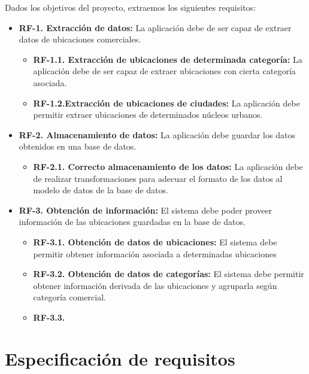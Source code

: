 Dados los objetivos del proyecto, extraemos los siguientes requisitos:

\begin{itemize}
	\item \textbf{RF-1. Extracción de datos:} La aplicación debe de ser capaz de extraer datos de ubicaciones comerciales.
		\begin{itemize}
			\item \textbf{RF-1.1. Extracción de ubicaciones de determinada categoría:} La aplicación debe de ser capaz de extraer ubicaciones con cierta categoría asociada.
			\item \textbf{RF-1.2.Extracción de ubicaciones de ciudades:} La aplicación debe permitir extraer ubicaciones de determinados núcleos urbanos.
		\end{itemize}
	\item \textbf{RF-2. Almacenamiento de datos:} La aplicación debe guardar los datos obtenidos en una base de datos.
		\begin{itemize}
			\item \textbf{RF-2.1. Correcto almacenamiento de los datos:} La aplicación debe de realizar transformaciones para adecuar el formato de los datos al modelo de datos de la base de datos.
		\end{itemize}
	\item \textbf{RF-3. Obtención de información:} El sistema debe poder proveer información de las ubicaciones guardadas en la base de datos.
		\begin{itemize}
			\item \textbf{RF-3.1. Obtención de datos de ubicaciones:} El sistema debe permitir obtener información asociada a determinadas ubicaciones
			\item \textbf{RF-3.2. Obtención de datos de categorías:} El sistema debe permitir obtener información derivada de las ubicaciones y agruparla según categoría comercial.
			\item \textbf{RF-3.3. }
		\end{itemize}
\end{itemize}


\section{Especificación de requisitos}


